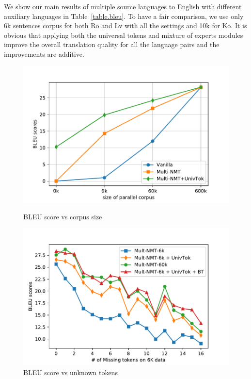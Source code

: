 We show our main results of multiple source languages to English with different auxiliary languages in Table~\ref{table.bleu}. To have a fair comparison, we use only 6k sentences corpus for both Ro and Lv with all the settings and 10k for Ko. It is obvious that applying both the universal tokens and mixture of experts modules  improve the overall translation quality for all the language pairs and the improvements are additive. 

 \begin{figure}[t]
	\centering
    \begin{minipage}[t]{0.48\textwidth}
    \centering
    \includegraphics[width=\linewidth]{figs/ulr/size}\hspace{-5pt}
    \caption{\label{fig.size}BLEU score vs corpus size}
    \end{minipage}
    \begin{minipage}[t]{0.48\textwidth}
    \centering
    \includegraphics[width=\linewidth]{figs/ulr/missing}\hspace{-5pt}
    \caption{\label{fig.missing}BLEU score vs unknown tokens}
    \end{minipage}
\end{figure}


